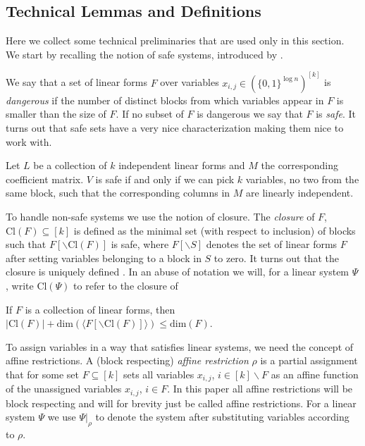\documentclass[10pt,a4paper]{article}
\theoremstyle{definition}
\theoremstyle{remark}
\theoremstyle{example}
\theoremstyle{plain}
\renewcommand{\setminus}{\smallsetminus}
\newcommand{\cl}{\mathrm{Cl}}
\newcommand{\setsize}[1]{\lvert#1\rvert}
\begin{document}
\subsection{Technical Lemmas and Definitions}

Here we collect some technical preliminaries that are used only in this section. We start by recalling the notion of safe systems, introduced by \cite{EGI24regular}. 

We say that a set of linear forms $F$ over variables $x_{i,j} \in ({\{0,1\}}^{\log n})^{[k]}$ is \emph{dangerous} if the number of distinct blocks from which variables appear in $F$ is smaller than the size of $F$. If no subset of $F$ is dangerous we say that $F$ is \emph{safe}. It turns out that safe sets have a very nice characterization making them nice to work with.

\begin{lemma}
\label{lemma:safeSystem-charactarisation}
Let $L$ be a collection of $k$ independent linear forms and $M$ the corresponding coefficient matrix. $V$ is safe if and only if we can pick $k$ variables, no two from the same block, such that the corresponding columns in $M$ are linearly independent.
\end{lemma} 

To handle non-safe systems we use the notion of closure. The \emph{closure} of $F$, $\cl(F) \subseteq [k]$ is defined as the minimal set (with respect to inclusion) of blocks such that $F[\setminus \cl(F)]$ is safe, where $F[\setminus S]$ denotes the set of linear forms $F$ after setting variables belonging to a block in $S$ to zero. It turns out that the closure is uniquely defined \cite[Lemma 4.1]{EGI24regular}. In an abuse of notation we will, for a linear system $\Psi$, write $\cl(\Psi)$ to refer to the closure of 

\begin{lemma}
\label{lemma:safe-dimension-bound} If $F$ is a collection of linear forms, then $\setsize{\cl(F)} + \mathrm{dim}(\langle F[\setminus\cl(F)]\rangle) \leq
\mathrm{dim}(F)$.
\end{lemma}

To assign variables in a way that satisfies linear systems, we need the concept of affine restrictions. A (block respecting) \emph{affine restriction} $\rho$ is a partial assignment that for some set $F\subseteq [k]$ sets all variables $x_{i,j}$, $i\in [k]\setminus F$ as an affine function of the unassigned variables $x_{i,j}$, $i\in F$. In this paper all affine restrictions will be block respecting and will for brevity just be called affine restrictions. For a linear system $\Psi$ we use $\Psi|_\rho$ to denote the system after substituting variables according to $\rho$.
\end{document}
